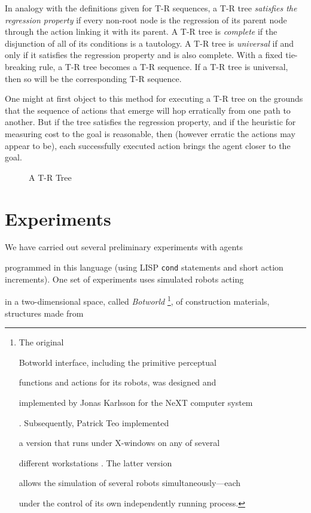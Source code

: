 In analogy with the definitions given for T-R sequences, a T-R tree {\it  
satisfies the regression property} if every non-root node is the regression  
of its parent node through the action linking it with its parent.  A T-R tree  
is {\it complete} if the disjunction of all of its conditions is a tautology.   
A T-R tree is {\it universal} if and only if it satisfies the regression  
property and is also complete.  With a fixed tie-breaking rule, a T-R tree  
becomes a T-R sequence.  If a T-R tree is universal, then so will be the  
corresponding T-R sequence. 


One might at first object to this method for executing a T-R tree on the  
grounds that the sequence of actions that emerge will hop erratically from  
one path to another.  But if the tree satisfies the regression property, and  
if the heuristic for measuring cost to the goal is reasonable, then (however  
erratic the actions may appear to be), each successfully executed action  
brings the agent closer to the goal.



\begin{figure}[htb]
\centerline{}
\caption{A T-R Tree} 

\end{figure} 


\section{Experiments}

We have carried out several preliminary experiments with agents 

programmed in this language (using LISP {\tt cond} statements and short
action increments).  One set of experiments uses simulated robots acting 

in a two-dimensional space, called {\it Botworld} \footnote{The original 

Botworld interface, including the primitive perceptual 

functions and actions for its robots, was designed and 

implemented by Jonas Karlsson for the NeXT computer system 

\cite{Karlsson}.  Subsequently, Patrick Teo implemented 

a version that runs under X-windows on any of several 

different workstations \cite{Teo1,Teo2}.  The latter version 

allows the simulation of several robots simultaneously---each 

under the control of its own independently running process.},  of  
construction materials, structures made from 

